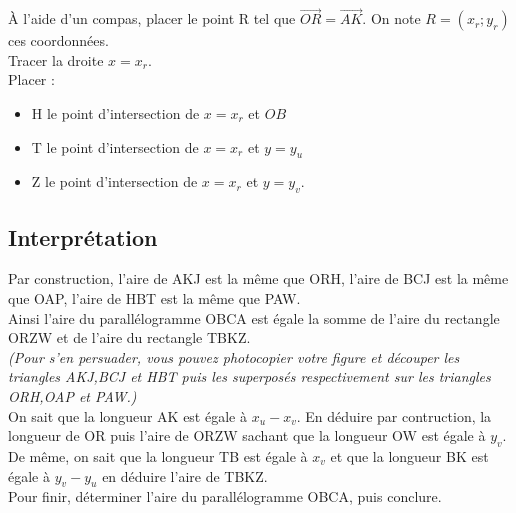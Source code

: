 \documentclass[french]{book}
\begin{document}
À l'aide d'un compas, placer le point R tel que $\overrightarrow{OR}=\overrightarrow{AK}$. On note $R=(x_r;y_r)$ ces coordonnées.\\

Tracer la droite $x=x_r$.\\

Placer : 
\begin{itemize}
\item H le point d'intersection de $x=x_r$ et $OB$
\item T le point d'intersection de $x=x_r$  et $y=y_u$
\item Z le point d'intersection de $x=x_r$ et $y=y_v$.\\
\end{itemize} 

\subsection*{Interprétation}

Par construction, l'aire de AKJ est la même que ORH, l'aire de BCJ est la même que OAP, l'aire de HBT est la même que PAW. \\

Ainsi l'aire du parallélogramme OBCA est égale la somme de l'aire du rectangle ORZW et de l'aire du rectangle TBKZ.\\

\textit{
(Pour s'en persuader, vous pouvez photocopier votre figure et découper les triangles AKJ,BCJ et HBT puis les superposés respectivement sur les triangles ORH,OAP et PAW.)}\\


On sait que la longueur AK est égale à $x_u-x_v$. En déduire par contruction, la longueur de OR puis l'aire de ORZW sachant que la longueur OW est égale à $y_v$.\\

De même, on sait que la longueur TB est égale à $x_v$ et que la longueur BK est égale à $y_v-y_u$ en déduire l'aire de TBKZ.\\

Pour finir, déterminer l'aire du parallélogramme OBCA, puis conclure.
\newpage
\end{document}
